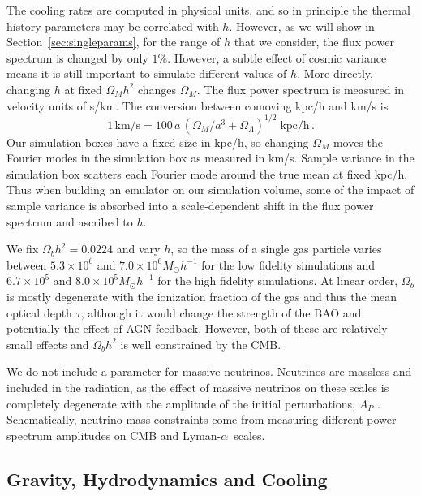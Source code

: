 \documentclass[a4paper,11pt]{article}
\newcommand{\Lya}{Lyman-$\alpha$}
\begin{document}
The cooling rates are computed in physical units, and so in principle the thermal history parameters may be correlated with $h$. However, as we will show in Section~\ref{sec:singleparams}, for the range of $h$ that we consider, the flux power spectrum is changed by only $1\%$. However, a subtle effect of cosmic variance means it is still important to simulate different values of $h$. More directly, changing $h$ at fixed $\Omega_M h^2$ changes $\Omega_M$. The flux power spectrum is measured in velocity units of s/km. The conversion between comoving kpc/h and km/s is
\begin{equation}
 1 \,\mathrm{km/s} =  100\, a \,(\Omega_M /a^3 + \Omega_\Lambda )^{1/2}\; \mathrm{kpc/h}\,.
\end{equation}
Our simulation boxes have a fixed size in kpc/h, so changing $\Omega_M$ moves the Fourier modes in the simulation box as measured in km/s. Sample variance in the simulation box scatters each Fourier mode around the true mean at fixed kpc/h. Thus when building an emulator on our simulation volume, some of the impact of sample variance is absorbed into a scale-dependent shift in the flux power spectrum and ascribed to $h$.

We fix $\Omega_b h^2 = 0.0224$ and vary $h$, so
the mass of a single gas particle varies between $5.3\times10^6$ and $7.0 \times 10^6 M_\odot h^{-1}$ for the low fidelity simulations and $6.7\times10^5$ and $8.0 \times 10^5 M_\odot h^{-1}$ for the high fidelity simulations. At linear order, $\Omega_b$ is mostly degenerate with the ionization fraction of the gas and thus the mean optical depth $\tau$, although it would change the strength of the BAO and potentially the effect of AGN feedback. However, both of these are relatively small effects and $\Omega_b h^2$ is well constrained by the CMB.

We do not include a parameter for massive neutrinos. Neutrinos are massless and included in the radiation, as the effect of massive neutrinos on these scales is completely degenerate with the amplitude of the initial perturbations, $A_P$ \cite{Pedersen:2020}.
Schematically, neutrino mass constraints come from measuring different power spectrum amplitudes on CMB and \Lya~scales.

\subsection{Gravity, Hydrodynamics and Cooling}
\label{sec:gravity}
\end{document}
